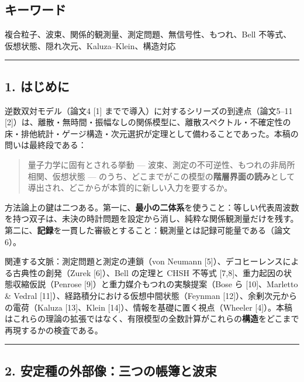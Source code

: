 \documentclass[
]{ltjsarticle}
\begin{document}
\subsection{キーワード}\label{ux30adux30fcux30efux30fcux30c9}

複合粒子、波束、関係的観測量、測定問題、無信号性、もつれ、Bell
不等式、仮想状態、隠れ次元、Kaluza--Klein、構造対応

\begin{center}\rule{0.5\linewidth}{0.5pt}\end{center}

\subsection{1. はじめに}\label{ux306fux3058ux3081ux306b}

逆数双対モデル（論文4 {[}1{]}
までで導入）に対するシリーズの到達点（論文5--11
{[}2{]}）は、離散・無時間・振幅なしの関係模型に、離散スペクトル・不確定性の床・排他統計・ゲージ構造・次元選択が定理として備わることであった。本稿の問いは最終段である：

\begin{quote}
量子力学に固有とされる挙動 ---
波束、測定の不可逆性、もつれの非局所相関、仮想状態 ---
のうち、どこまでがこの模型の\textbf{階層界面の読み}として導出され、どこからが本質的に新しい入力を要するか。
\end{quote}

方法論上の鍵は二つある。第一に、\textbf{最小の二体系}を使うこと：等しい代表周波数を持つ双子は、未決の時計問題を設定から消し、純粋な関係観測量だけを残す。第二に、\textbf{記録}を一貫した審級とすること：観測量とは記録可能量である（論文6）。

関連する文脈：測定問題と測定の連鎖（von Neumann
{[}5{]}）、デコヒーレンスによる古典性の創発（Zurek {[}6{]}）、Bell
の定理と CHSH 不等式 {[}7,8{]}、重力起因の状態収縮仮説（Penrose
{[}9{]}）と重力媒介もつれの実験提案（Bose ら {[}10{]}、Marletto \&
Vedral {[}11{]}）、経路積分における仮想中間状態（Feynman
{[}12{]}）、余剰次元からの電荷（Kaluza {[}13{]}、Klein
{[}14{]}）、情報を基礎に置く視点（Wheeler
{[}4{]}）。本稿はこれらの理論の拡張ではなく、有限模型の全数計算がこれらの\textbf{構造}をどこまで再現するかの検査である。

\begin{center}\rule{0.5\linewidth}{0.5pt}\end{center}

\subsection{2.
安定種の外部像：三つの帳簿と波束}\label{ux5b89ux5b9aux7a2eux306eux5916ux90e8ux50cfux4e09ux3064ux306eux5e33ux7c3fux3068ux6ce2ux675f}
\end{document}
